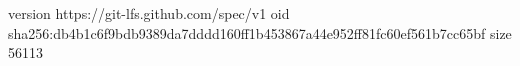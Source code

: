 version https://git-lfs.github.com/spec/v1
oid sha256:db4b1c6f9bdb9389da7dddd160ff1b453867a44e952ff81fc60ef561b7cc65bf
size 56113
